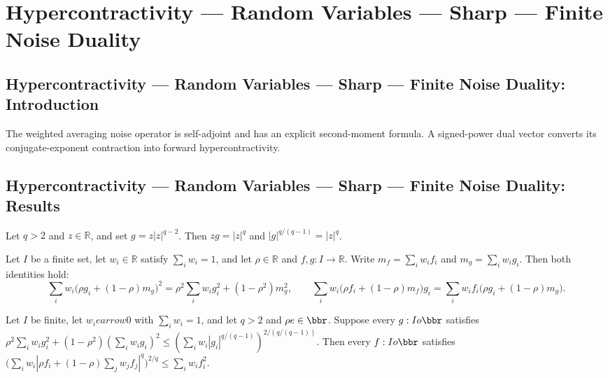 \section{Hypercontractivity --- Random Variables --- Sharp --- Finite Noise Duality}
\subsection*{Hypercontractivity --- Random Variables --- Sharp --- Finite Noise Duality: Introduction}
The weighted averaging noise operator is self-adjoint and has an explicit second-moment formula. A signed-power dual vector converts its conjugate-exponent contraction into forward hypercontractivity.

\subsection*{Hypercontractivity --- Random Variables --- Sharp --- Finite Noise Duality: Results}

\begin{theorem}
\leanok
{}
Let $q>2$ and $z\in\mathbb R$, and set $g=z|z|^{q-2}$. Then $zg=|z|^q$ and
$|g|^{q/(q-1)}=|z|^q$.
\end{theorem}

\begin{theorem}
\leanok
{}
Let $I$ be a finite set, let $w_i\in\mathbb{R}$ satisfy $\sum_i w_i=1$, and let
$\rho\in\mathbb{R}$ and $f,g:I\to\mathbb{R}$. Write $m_f=\sum_i w_i f_i$ and $m_g=\sum_i
w_i g_i$. Then both identities hold:
\[
\sum_i w_i\bigl(\rho g_i+(1-\rho)m_g\bigr)^2=\rho^2\sum_i w_i g_i^2+(1-\rho^2)m_g^2,
\qquad
\sum_i w_i\bigl(\rho f_i+(1-\rho)m_f\bigr)g_i=\sum_i w_i f_i\bigl(\rho
g_i+(1-\rho)m_g\bigr).
\]
\end{theorem}

\begin{theorem}
\leanok
{}
Let $I$ be finite, let $w_i
earrow0$ with $\sum_iw_i=1$, and let $q>2$ and $\rho
e\in\bbr$. Suppose every $g:I	o\bbr$ satisfies
$\rho^2\sum_iw_ig_i^2+(1-\rho^2)(\sum_iw_ig_i)^2\le(\sum_iw_i|g_i|^{q/(q-1)})^{2/(q/(q-1))}$.
Then every $f:I	o\bbr$ satisfies $\bigl(\sum_iw_i|\rho
f_i+(1-\rho)\sum_jw_jf_j|^q\bigr)^{2/q}\le\sum_iw_if_i^2$.
\end{theorem}

